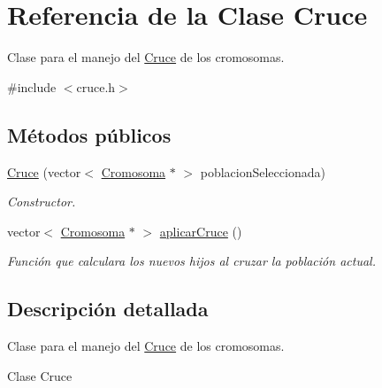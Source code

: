 \hypertarget{classCruce}{\section{Referencia de la Clase Cruce}
\label{classCruce}
}


Clase para el manejo del \hyperlink{classCruce}{Cruce} de los cromosomas.  




{\ttfamily \#include $<$cruce.\-h$>$}

\subsection*{Métodos públicos}
\begin{DoxyCompactItemize}
\item 
\hyperlink{classCruce_af0c3421f9764a791c63c08cd98a50b3b}{Cruce} (vector$<$ \hyperlink{classCromosoma}{Cromosoma} $\ast$ $>$ poblacion\-Seleccionada)
\begin{DoxyCompactList}\small\item\em Constructor. \end{DoxyCompactList}\item 
vector$<$ \hyperlink{classCromosoma}{Cromosoma} $\ast$ $>$ \hyperlink{classCruce_a5fd9d9cbca36abf7d81f5eedc06f18e7}{aplicar\-Cruce} ()
\begin{DoxyCompactList}\small\item\em Función que calculara los nuevos hijos al cruzar la población actual. \end{DoxyCompactList}\end{DoxyCompactItemize}


\subsection{Descripción detallada}
Clase para el manejo del \hyperlink{classCruce}{Cruce} de los cromosomas. 

\begin{DoxyVerb}Clase Cruce
\end{DoxyVerb}


